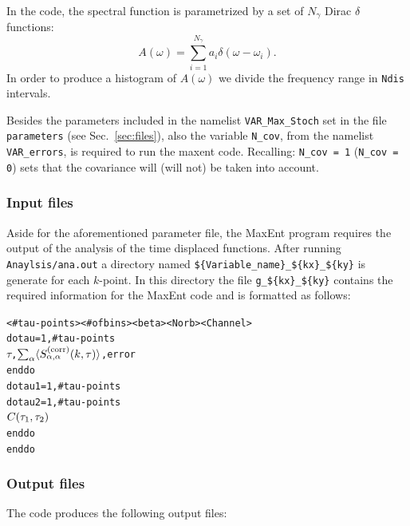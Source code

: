 In the code, the spectral function is parametrized  by a  set of $N_{\gamma}$ Dirac $\delta$ functions: 
\begin{equation}
      A(\omega)  = \sum_{i=1}^{N_{\gamma}} a_{i} \delta \left( \omega - \omega_i \right).
\end{equation}
In order to produce a histogram of  $ A(\omega) $ we divide  the frequency range in \texttt{Ndis} intervals. 

Besides the parameters included in the namelist \texttt{VAR\_Max\_Stoch} set in the file \texttt{parameters} (see Sec.~\ref{sec:files}), also the variable \texttt{N\_cov}, from the namelist \texttt{VAR\_errors}, is required to run the maxent code. Recalling: \texttt{N\_cov = 1} (\texttt{N\_cov = 0}) sets that the covariance will (will not) be taken into account.

\subsubsection*{Input files} 
Aside for the aforementioned parameter file, the MaxEnt program requires the output of the  analysis of the time displaced functions. After running \texttt{Anaylsis/ana.out} a directory named    \texttt{\$\{Variable\_name\}}\texttt{\_\$\{kx\}\_\$\{ky\}}   is  generate for each $k$-point.  In this directory  the file \texttt{g\_\$\{kx\}\_\$\{ky\}} contains the  required information for the MaxEnt code  and is  formatted as follows:
\begin{alltt}
< # tau-points >  <# of bins >  <beta>  <Norb>  <Channel>
do tau = 1,  # tau-points
   \( \tau \),  \( \sum\sb{\alpha}\langle{S}\sb{\alpha,\alpha}\sp{(\mathrm{corr})}(k,\tau)\rangle\),   error
enddo
do tau1 = 1,  # tau-points
  do tau2 = 1,  # tau-points
     \( C( \tau\sb{1},\tau\sb{2} ) \)
  enddo
enddo
\end{alltt}



\subsubsection*{Output files}

The code produces the following output files:

